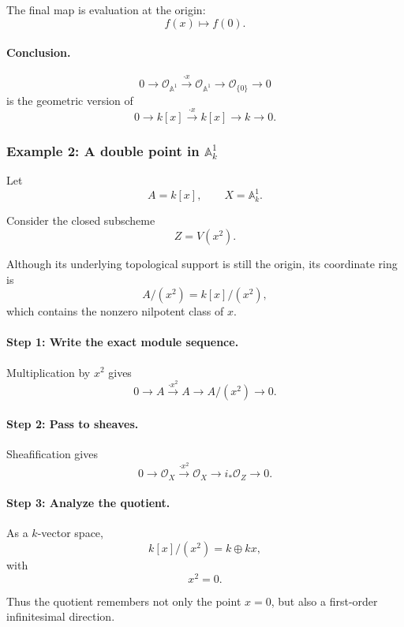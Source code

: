 \documentclass[12pt,a4paper]{article}
\theoremstyle{notespace}
\begin{document}
The final map is evaluation at the origin:
\[
f(x)\longmapsto f(0).
\]

\paragraph{Conclusion.}

\[
\boxed{
	0
	\to
	\mathcal{O}_{\mathbb{A}^{1}}
	\xrightarrow{\cdot x}
	\mathcal{O}_{\mathbb{A}^{1}}
	\to
	\mathcal{O}_{\{0\}}
	\to
	0
}
\]
is the geometric version of
\[
\boxed{
	0
	\to
	k[x]
	\xrightarrow{\cdot x}
	k[x]
	\to
	k
	\to
	0.
}
\]

\subsubsection{Example 2: A double point in \texorpdfstring{\(\mathbb{A}^{1}_{k}\)}{A1}}

Let
\[
A=k[x],
\qquad
X=\mathbb{A}^{1}_{k}.
\]

Consider the closed subscheme
\[
Z=V(x^{2}).
\]

Although its underlying topological support is still the origin, its
coordinate ring is
\[
A/(x^{2})
=
k[x]/(x^{2}),
\]
which contains the nonzero nilpotent class of \(x\).

\paragraph{Step 1: Write the exact module sequence.}

Multiplication by \(x^{2}\) gives
\[
0
\longrightarrow
A
\xrightarrow{\cdot x^{2}}
A
\longrightarrow
A/(x^{2})
\longrightarrow
0.
\]

\paragraph{Step 2: Pass to sheaves.}

Sheafification gives
\[
0
\longrightarrow
\mathcal{O}_{X}
\xrightarrow{\cdot x^{2}}
\mathcal{O}_{X}
\longrightarrow
i_{*}\mathcal{O}_{Z}
\longrightarrow
0.
\]

\paragraph{Step 3: Analyze the quotient.}

As a \(k\)-vector space,
\[
k[x]/(x^{2})
=
k\oplus kx,
\]
with
\[
x^{2}=0.
\]

Thus the quotient remembers not only the point \(x=0\), but also a first-order
infinitesimal direction.
\end{document}
